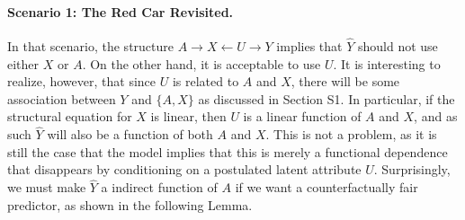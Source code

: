 \paragraph{Scenario 1: The Red Car Revisited.}
In that scenario, the structure $A \rightarrow X \leftarrow U
\rightarrow Y$ implies that $\hat Y$ should not use either $X$ or
$A$. On the other hand, it is acceptable to use $U$.  It is
interesting to realize, however, that since $U$ is related to $A$ and
$X$, there will be some association between $Y$ and $\{A, X\}$ as
discussed in Section S1. In particular, if the structural equation for
$X$ is linear, then $U$ is a linear function of $A$ and $X$, and as
such $\hat Y$ will also be a function of both $A$ and $X$. This is not
a problem, as it is still the case that the model implies that this is
merely a functional dependence that disappears by conditioning on a
postulated latent attribute $U$. Surprisingly, we must make $\hat Y$ a
indirect function of $A$ if we want a counterfactually fair predictor,
as shown in the following Lemma.

